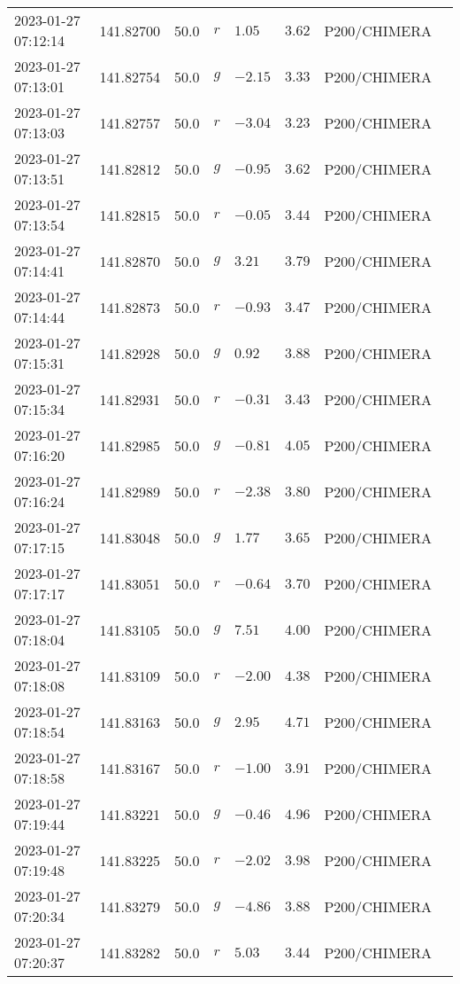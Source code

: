 \documentclass{nature_plusfigure}
\begin{document}
\begin{supplement}
\begin{center}
\begin{longtable}{llllllll}
2023-01-27 07:12:14 & 141.82700 & 50.0 & $r$ & $1.05$ & $3.62$ & P200/CHIMERA &  \\ 
2023-01-27 07:13:01 & 141.82754 & 50.0 & $g$ & $-2.15$ & $3.33$ & P200/CHIMERA &  \\ 
2023-01-27 07:13:03 & 141.82757 & 50.0 & $r$ & $-3.04$ & $3.23$ & P200/CHIMERA &  \\ 
2023-01-27 07:13:51 & 141.82812 & 50.0 & $g$ & $-0.95$ & $3.62$ & P200/CHIMERA &  \\ 
2023-01-27 07:13:54 & 141.82815 & 50.0 & $r$ & $-0.05$ & $3.44$ & P200/CHIMERA &  \\ 
2023-01-27 07:14:41 & 141.82870 & 50.0 & $g$ & $3.21$ & $3.79$ & P200/CHIMERA &  \\ 
2023-01-27 07:14:44 & 141.82873 & 50.0 & $r$ & $-0.93$ & $3.47$ & P200/CHIMERA &  \\ 
2023-01-27 07:15:31 & 141.82928 & 50.0 & $g$ & $0.92$ & $3.88$ & P200/CHIMERA &  \\ 
2023-01-27 07:15:34 & 141.82931 & 50.0 & $r$ & $-0.31$ & $3.43$ & P200/CHIMERA &  \\ 
2023-01-27 07:16:20 & 141.82985 & 50.0 & $g$ & $-0.81$ & $4.05$ & P200/CHIMERA &  \\ 
2023-01-27 07:16:24 & 141.82989 & 50.0 & $r$ & $-2.38$ & $3.80$ & P200/CHIMERA &  \\ 
2023-01-27 07:17:15 & 141.83048 & 50.0 & $g$ & $1.77$ & $3.65$ & P200/CHIMERA &  \\ 
2023-01-27 07:17:17 & 141.83051 & 50.0 & $r$ & $-0.64$ & $3.70$ & P200/CHIMERA &  \\ 
2023-01-27 07:18:04 & 141.83105 & 50.0 & $g$ & $7.51$ & $4.00$ & P200/CHIMERA &  \\ 
2023-01-27 07:18:08 & 141.83109 & 50.0 & $r$ & $-2.00$ & $4.38$ & P200/CHIMERA &  \\ 
2023-01-27 07:18:54 & 141.83163 & 50.0 & $g$ & $2.95$ & $4.71$ & P200/CHIMERA &  \\ 
2023-01-27 07:18:58 & 141.83167 & 50.0 & $r$ & $-1.00$ & $3.91$ & P200/CHIMERA &  \\ 
2023-01-27 07:19:44 & 141.83221 & 50.0 & $g$ & $-0.46$ & $4.96$ & P200/CHIMERA &  \\ 
2023-01-27 07:19:48 & 141.83225 & 50.0 & $r$ & $-2.02$ & $3.98$ & P200/CHIMERA &  \\ 
2023-01-27 07:20:34 & 141.83279 & 50.0 & $g$ & $-4.86$ & $3.88$ & P200/CHIMERA &  \\ 
2023-01-27 07:20:37 & 141.83282 & 50.0 & $r$ & $5.03$ & $3.44$ & P200/CHIMERA &  \\ 

\end{longtable}
\end{center}
\end{supplement}
\end{document}
